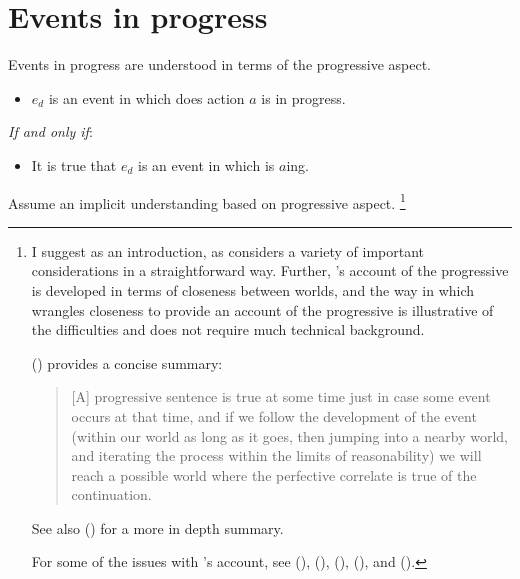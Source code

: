 \begin{note}

\end{note}



\section{Events in progress}
\label{sec:events-progress}


\begin{note}
  Events in progress are understood in terms of the progressive aspect.

  \begin{definition}
    \vspace{-\baselineskip}
    \begin{itemize}
    \item
      \(e_{d}\) is an event in which \vAgent{} does action \(a\) is in progress.
    \end{itemize}
    \emph{If and only if}:
    \begin{itemize}
    \item
      It is true that \(e_{d}\) is an event in which \vAgent{} is \(a\)ing.
    \end{itemize}
    \vspace{-\baselineskip}
  \end{definition}

  \noindent%
  Assume an implicit understanding based on progressive aspect.%
  \footnote{
    \nocite{Portner:1998um}
    \nocite{Engelberg:1999vi}
    I suggest \textcite{Landman:1992wh} as an introduction, as \citeauthor{Landman:1992wh} considers a variety of important considerations in a straightforward way.
    Further, \citeauthor{Landman:1992wh}'s account of the progressive is developed in terms of closeness between worlds, and the way in which \citeauthor{Landman:1992wh} wrangles closeness to provide an account of the progressive is illustrative of the difficulties and does not require much technical background.

    \citeauthor{Szabo:2004ul} (\citeyear[34]{Szabo:2004ul}) provides a concise summary:
    \begin{quote}
      [A] progressive sentence is true at some time just in case some event occurs at that time, and if we follow the development of the event (within our world as long as it goes, then jumping into a nearby world, and iterating the process within the limits of reasonability) we will reach a possible world where the perfective correlate is true of the continuation.
    \end{quote}
    See also (\cite[764--766]{Portner:1998um}) for a more in depth summary.

    For some of the issues with \citeauthor{Landman:1992wh}'s account, see (\cite{Bonomi:1997uq}), (\cite[49--50]{Engelberg:1999vi}), (\cite[35]{Szabo:2004ul}), (\cite[767]{Portner:1998um}), and (\cite[esp.][1256]{Portner:2011vi}).
  }

\end{note}



